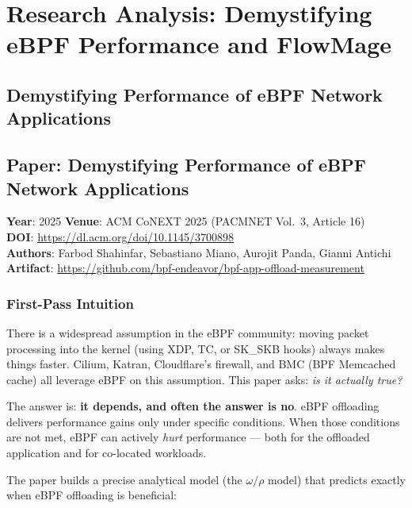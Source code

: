 
\section{Research Analysis: Demystifying eBPF Performance and FlowMage}
\label{sec:demystifying-flowmage}

\subsection{Demystifying Performance of eBPF Network Applications}

\subsection*{Paper: Demystifying Performance of eBPF Network Applications}
\textbf{Year}: 2025 \quad \textbf{Venue}: ACM CoNEXT 2025 (PACMNET Vol.\ 3, Article 16)\\
\textbf{DOI}: \url{https://dl.acm.org/doi/10.1145/3700898}\\
\textbf{Authors}: Farbod Shahinfar, Sebastiano Miano, Aurojit Panda, Gianni Antichi\\
\textbf{Artifact}: \url{https://github.com/bpf-endeavor/bpf-app-offload-measurement}

\subsubsection{First-Pass Intuition}

There is a widespread assumption in the eBPF community: moving packet processing into the kernel (using XDP, TC, or SK\_SKB hooks) always makes things faster. Cilium, Katran, Cloudflare's firewall, and BMC (BPF Memcached cache) all leverage eBPF on this assumption. This paper asks: \emph{is it actually true?}

The answer is: \textbf{it depends, and often the answer is no}. eBPF offloading delivers performance gains only under specific conditions. When those conditions are not met, eBPF can actively \emph{hurt} performance --- both for the offloaded application and for co-located workloads.

The paper builds a precise analytical model (the $\omega/\rho$ model) that predicts exactly when eBPF offloading is beneficial:


